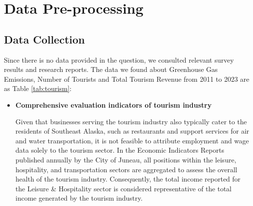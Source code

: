 \documentclass{mcmthesis}
\begin{document}
\section{Data Pre-processing}
\subsection{Data Collection}
Since there is no data provided in the question, we consulted relevant survey 
results and research reports. The data we found about Greenhouse Gas Emissions, Number of Tourists and Total Tourism Revenue from 2011 to 2023 are as Table \ref{tab:tourism}:
\begin{itemize}
  \item \textbf{Comprehensive evaluation indicators of tourism industry}\par
  Given that businesses serving the tourism industry also typically cater to the 
  residents of Southeast Alaska, such as restaurants and support services for air and 
  water transportation, it is not feasible to attribute employment and wage data 
  solely to the tourism sector. In the Economic Indicators Reports published annually 
  by the City of Juneau, all positions within the leisure, hospitality, and transportation 
  sectors are aggregated to assess the overall health of the tourism industry. 
  Consequently, the total income reported for the Leisure \& Hospitality sector is 
  considered representative of the total income generated by the tourism industry.


\end{itemize}
\end{document}
